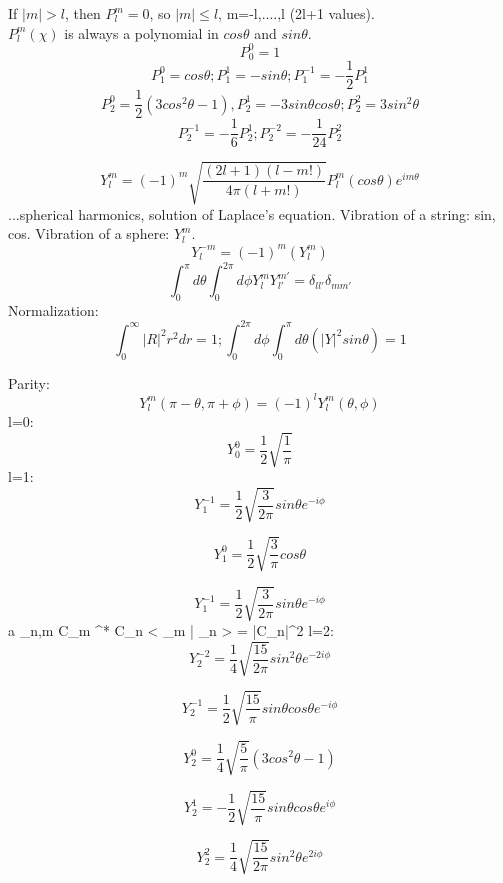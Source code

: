 \documentclass[12pt,a4paper]{article}
\begin{document}
If $|m|>l$, then $P_l ^m = 0$, so $|m| \leq l$, m=-l,....,l (2l+1 values).\\
$P_l ^m (\chi )$ is always a polynomial in $cos \theta$ and $sin \theta$.
\[
P_0 ^0 =1
\]
\[
P_1 ^0 = cos \theta ; P_1 ^1 = -sin \theta ; P_1 ^{-1} = - \frac{1}{2} P_1 ^1
\]
\[
P_2 ^0 = \frac{1}{2} ( 3 cos ^2 \theta -1 ), P_2 ^1 = -3 sin \theta cos \theta ;  P_2 ^2 =3 sin ^2 \theta 
\]
\[
P_2 ^{-1}= - \frac{1}{6} P_2 ^1;P_2 ^{-2}= - \frac{1}{24} P_2 ^2
\] 

\[
Y_l ^m = (-1)^m \sqrt{\frac{(2l+1)(l-m!)}{4 \pi (l+m!)}} P_l ^m (cos \theta ) e^{im \theta }
\]
...spherical harmonics, solution of Laplace's equation. Vibration of a string: sin, cos. Vibration of a sphere: $Y_l ^m$.
\[
Y_l ^{-m} = (-1)^m (Y_l ^m)
\]
\[
\int _0 ^{\pi} d \theta \int _0 ^{2 \pi} d \phi Y_l ^m Y_{l'} ^{m'}= \delta _{ll'} \delta _{mm'}
\]
Normalization:
\[
\int _0 ^{\infty} |R|^2 r^2 dr =1; \int _0 ^{2 \pi} d \phi \int _0 ^{\pi} d \theta  (|Y|^2 sin \theta ) =1
\]

Parity:
\[
Y_l ^m ( \pi - \theta , \pi + \phi )= (-1)^l Y_l ^m (\theta , \phi )
\]
l=0:\\
\[
Y_0 ^0 = \frac{1}{2} \sqrt{\frac{1}{\pi}}
\]
l=1:\\
\[
Y_1 ^{-1} = \frac{1}{2} \sqrt{\frac{3}{2 \pi}} sin \theta e^{-i \phi}
\]

\[
Y_1 ^0 = \frac{1}{2} \sqrt{\frac{3}{\pi}} cos \theta
\]

\[
Y_1 ^{-1} = \frac{1}{2} \sqrt{\frac{3}{2 \pi}} sin \theta e^{-i \phi}
\]
a _{n,m} C_m ^* C_n < \psi _m | \psi _n > = \Sigma |C_n|^2
l=2:\\
\[
Y_2 ^{-2} = \frac{1}{4} \sqrt{\frac{15}{2 \pi}} sin ^2  \theta e^{-2i \phi}
\]

\[
Y_2 ^{-1} = \frac{1}{2} \sqrt{\frac{15}{\pi}}  sin \theta cos \theta e^{-i \phi}
\]

\[
Y_2 ^{0} = \frac{1}{4} \sqrt{\frac{5}{ \pi}}(3 cos^2 \theta -1 )
\]

\[
Y_2 ^{1} = - \frac{1}{2} \sqrt{\frac{15}{\pi}}  sin \theta cos \theta e^{i \phi}
\]

\[
Y_2 ^{2} = \frac{1}{4} \sqrt{\frac{15}{2 \pi}} sin ^2  \theta e^{2i \phi}
\]
\end{document}
